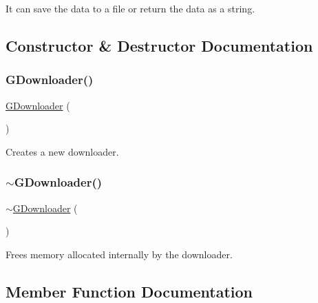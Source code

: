 It can save the data to a file or return the data as a string. 

\subsection{Constructor \& Destructor Documentation}
\mbox{\label{classGDownloader_a03a6336ad3aebf9d5904c50ce0cdc1dc}} 
\subsubsection{\texorpdfstring{G\+Downloader()}{GDownloader()}}
{\footnotesize\ttfamily \mbox{\hyperlink{classGDownloader}{G\+Downloader}} (\begin{DoxyParamCaption}{ }\end{DoxyParamCaption})}



Creates a new downloader. 

\mbox{\label{classGDownloader_a6a9f476cb937e98d417d8ab43b8cd8d5}} 
\subsubsection{\texorpdfstring{$\sim$\+G\+Downloader()}{~GDownloader()}}
{\footnotesize\ttfamily $\sim$\mbox{\hyperlink{classGDownloader}{G\+Downloader}} (\begin{DoxyParamCaption}{ }\end{DoxyParamCaption})\hspace{0.3cm}{\ttfamily [virtual]}}



Frees memory allocated internally by the downloader. 



\subsection{Member Function Documentation}
\mbox{\label{classGDownloader_a27b002ce17000e199302c608363c97a2}} 
